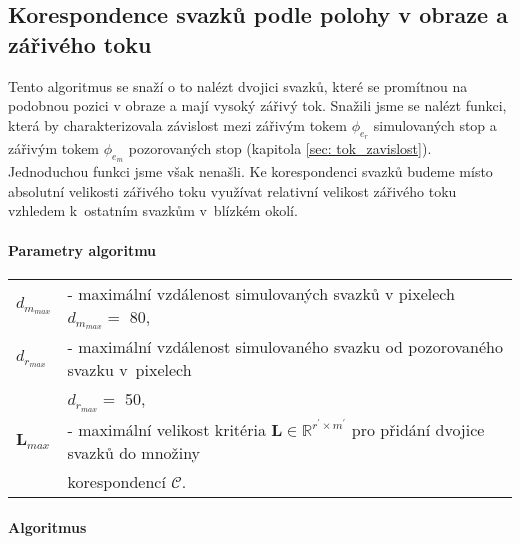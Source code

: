 \newpage
\subsection{Korespondence svazků podle polohy v obraze a zářivého toku}
\label{sec: poloha_tok}
	Tento algoritmus se snaží o to nalézt dvojici svazků, které se promítnou na podobnou pozici v obraze a mají vysoký zářivý tok. Snažili jsme se nalézt funkci, která by charakterizovala závislost mezi zářivým tokem $\phi_{e_{r}}$ simulovaných stop a zářivým tokem $\phi_{e_{m}}$ pozorovaných stop (kapitola \ref{sec: tok_zavislost}). Jednoduchou funkci jsme však nenašli. Ke korespondenci svazků budeme místo absolutní velikosti zářivého toku využívat relativní velikost zářivého toku vzhledem k~ostatním svazkům v~blízkém okolí. 

\paragraph{Parametry algoritmu}
\hspace{1mm}
	 
	 \begin{tabular}{l L{13.5cm}}
	 $d_{m_{max}}$ & - maximální vzdálenost simulovaných svazků v pixelech  $d_{m_{max}} = $ \SI{80}{\px},\\
	 $d_{r_{max}}$ & - maximální vzdálenost simulovaného svazku od pozorovaného svazku v~pixelech \\
	 & $d_{r_{max}} = $ \SI{50}{\px},\\
	 $\mathbf{L}_{max}$ &  - maximální velikost kritéria  $\mathbf{L} \in \mathbb{R}^{r^\prime\times m^\prime}$ pro přidání dvojice svazků do množiny \\
	 & korespondencí $\mathcal{C}$. \\
	 \end{tabular}

\paragraph{Algoritmus}

